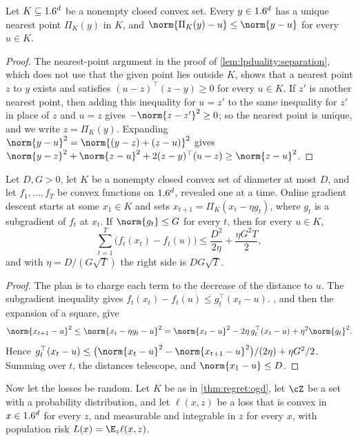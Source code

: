 \begin{refsection}
\begin{lemma}[Projection]\label{lem:regret:projection}
Let $K\subseteq1.6^d$ be a nonempty closed convex set. Every $y\in1.6^d$ has a unique nearest point $\Pi_K(y)$ in $K$, and $\norm{\Pi_K(y)-u}\le\norm{y-u}$ for every $u\in K$.
\end{lemma}

\begin{proof}
The nearest-point argument in the proof of \cref{lem:lpduality:separation}, which does not use that the given point lies outside $K$, shows that a nearest point $z$ to $y$ exists and satisfies $(u-z)^\top(z-y)\ge0$ for every $u\in K$. If $z'$ is another nearest point, then adding this inequality for $u=z'$ to the same inequality for $z'$ in place of $z$ and $u=z$ gives $-\norm{z-z'}^2\ge0$; so the nearest point is unique, and we write $z=\Pi_K(y)$. Expanding $\norm{y-u}^2=\norm{(y-z)+(z-u)}^2$ gives $\norm{y-z}^2+\norm{z-u}^2+2(z-y)^\top(u-z)\ge\norm{z-u}^2$.
\end{proof}

\begin{theorem}\label{thm:regret:ogd}
Let $D,G>0$, let $K$ be a nonempty closed convex set of diameter at most $D$, and let $f_1,\dots,f_T$ be convex functions on $1.6^d$, revealed one at a time. Online gradient descent starts at some $x_1\in K$ and sets $x_{t+1}=\Pi_K(x_t-\eta g_t)$, where $g_t$ is a subgradient of $f_t$ at $x_t$. If $\norm{g_t}\le G$ for every $t$, then for every $u\in K$,
\[
\sum_{t=1}^T\bigl(f_t(x_t)-f_t(u)\bigr)\le\frac{D^2}{2\eta}+\frac{\eta G^2T}2 ,
\]
and with $\eta=D/(G\sqrt T)$ the right side is $DG\sqrt T$.
\end{theorem}

\begin{proof}
The plan is to charge each term to the decrease of the distance to $u$. The subgradient inequality gives $f_t(x_t)-f_t(u)\le g_t^\top(x_t-u)$. , and then the expansion of a square, give
\[
\norm{x_{t+1}-u}^2\le\norm{x_t-\eta g_t-u}^2=\norm{x_t-u}^2-2\eta\,g_t^\top(x_t-u)+\eta^2\norm{g_t}^2 .
\]
Hence $g_t^\top(x_t-u)\le\bigl(\norm{x_t-u}^2-\norm{x_{t+1}-u}^2\bigr)/(2\eta)+\eta G^2/2$. Summing over $t$, the distances telescope, and $\norm{x_1-u}\le D$.
\end{proof}

Now let the losses be random. Let $K$ be as in \cref{thm:regret:ogd}, let $\cZ$ be a set with a probability distribution, and let $\ell(x,z)$ be a loss that is convex in $x\in1.6^d$ for every $z$, and measurable and integrable in $z$ for every $x$, with population risk $L(x)=\E_z\ell(x,z)$.


\end{refsection}
